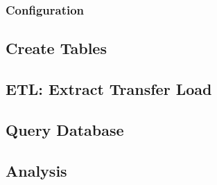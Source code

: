 
\subsubsection{Configuration}


\subsection{Create Tables}






\subsection{ETL: Extract Transfer Load}





\subsection{Query Database}





\subsection{Analysis}



